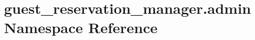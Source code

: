 \hypertarget{namespaceguest__reservation__manager_1_1admin}{\section{guest\-\_\-reservation\-\_\-manager.\-admin Namespace Reference}
\label{namespaceguest__reservation__manager_1_1admin}
}
